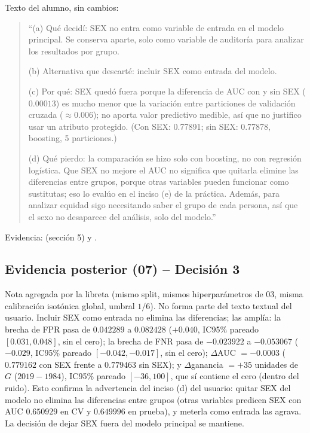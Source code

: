 Texto del alumno, sin cambios:
\begin{quote}
``(a) Qué decidí: SEX no entra como variable de entrada en el modelo
principal. Se conserva aparte, solo como variable de auditoría para
analizar los resultados por grupo.

(b) Alternativa que descarté: incluir SEX como entrada del modelo.

(c) Por qué: SEX quedó fuera porque la diferencia de AUC con y sin SEX
($0.00013$) es mucho menor que la variación entre particiones de
validación cruzada ($\approx 0.006$); no aporta valor predictivo medible, así
que no justifico usar un atributo protegido. (Con SEX: 0.77891; sin
SEX: 0.77878, boosting, 5 particiones.)

(d) Qué pierdo: la comparación se hizo solo con boosting, no con regresión
logística. Que SEX no mejore el AUC no significa que quitarla elimine
las diferencias entre grupos, porque otras variables pueden funcionar
como sustitutas; eso lo evalúo en el inciso (e) de la práctica. Además,
para analizar equidad sigo necesitando saber el grupo de cada persona,
así que el sexo no desaparece del análisis, solo del modelo.''
\end{quote}
Evidencia:  (sección 5) y
.

\subsection*{Evidencia posterior (07) -- Decisión 3}

Nota agregada por la libreta  (mismo split,
mismos hiperparámetros de 03, misma calibración isotónica global, umbral
$1/6$). No forma parte del texto textual del usuario. Incluir SEX como
entrada no elimina las diferencias; las amplía: la brecha de FPR pasa de
$0.042289$ a $0.082428$ ($+0.040$, IC95\% pareado $[0.031,0.048]$, sin el
cero); la brecha de FNR pasa de $-0.023922$ a $-0.053067$ ($-0.029$,
IC95\% pareado $[-0.042,-0.017]$, sin el cero); $\Delta$AUC $=-0.0003$
($0.779162$ con SEX frente a $0.779463$ sin SEX); y $\Delta$ganancia
$=+35$ unidades de $G$ ($2019-1984$), IC95\% pareado $[-36,100]$, que sí
contiene el cero (dentro del ruido). Esto confirma la advertencia del inciso
(d) del usuario: quitar SEX del modelo no elimina las diferencias entre
grupos (otras variables predicen SEX con AUC $0.650929$ en CV y $0.649996$
en prueba), y meterla como entrada las agrava. La decisión de dejar SEX
fuera del modelo principal se mantiene.

